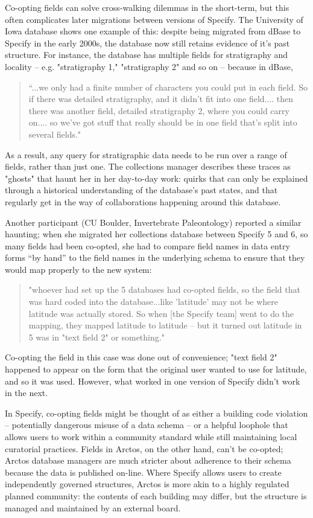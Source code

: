 Co-opting fields can solve cross-walking dilemmas in the short-term, but this often complicates later migrations between versions of Specify. The University of Iowa database shows one example of this: despite being migrated from dBase to Specify in the early 2000s, the database now still retains evidence of it's past structure. For instance, the database has multiple fields for stratigraphy and locality -- e.g. "stratigraphy 1," "stratigraphy 2" and so on -- because in dBase,\begin{quote} “...we only had a finite number of characters you could put in each field. So if there was detailed stratigraphy, and it didn't fit into one field.... then there was another field, detailed stratigraphy 2, where you could carry on.... so we've got stuff that really should be in one field that's split into several fields."\end{quote}
As a result, any query for stratigraphic data needs to be run over a range of fields, rather than just one. The collections manager describes these traces as "ghosts" that haunt her in her day-to-day work: quirks that can only be explained through a historical understanding of the database's past states, and that regularly get in the way of collaborations happening around this database.

Another participant (CU Boulder, Invertebrate Paleontology) reported a similar haunting; when she migrated her collections database between Specify 5 and 6, so many fields had been co-opted, she had to compare field names in data entry forms “by hand” to the field names in the underlying schema to ensure that they would map properly to the new system: 
\begin{quote}
"whoever had set up the 5 databases had co-opted fields, so the field that was hard coded into the database...like 'latitude' may not be where latitude was actually stored. So when [the Specify team] went to do the mapping, they mapped latitude to latitude -- but it turned out latitude in 5 was in "text field 2" or something." 
\end{quote}
Co-opting the field in this case was done out of convenience; "text field 2" happened to appear on the form that the original user wanted to use for latitude, and so it was used. However, what worked in one version of Specify didn't work in the next.

In Specify, co-opting fields might be thought of as either a building code violation -- potentially dangerous misuse of a data schema -- or a helpful loophole that allows users to work within a community standard while still maintaining local curatorial practices. Fields in Arctos, on the other hand, can't be co-opted; Arctos database managers are much stricter about adherence to their schema because the data is published on-line. Where Specify allows users to create independently governed structures, Arctos is more akin to a highly regulated planned community: the contents of each building may differ, but the structure is managed and maintained by an external board.

